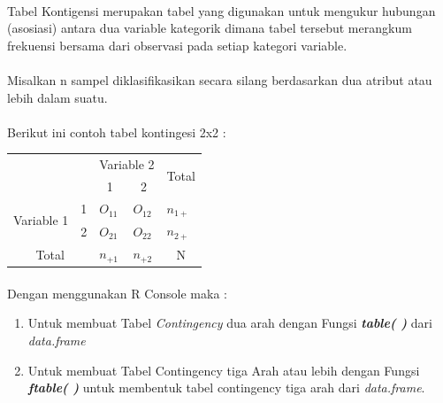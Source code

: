 \documentclass[a4paper,12pt]{article}
\begin{document}
\paragraph{}
Tabel Kontigensi merupakan tabel yang digunakan untuk mengukur hubungan (asosiasi) antara dua variable kategorik dimana tabel tersebut merangkum frekuensi bersama dari observasi pada setiap kategori variable. 
\paragraph{}
Misalkan n sampel diklasifikasikan secara silang berdasarkan dua atribut atau lebih dalam suatu.
\paragraph{}
Berikut ini contoh tabel kontingesi 2x2 :
\begin{table}[!ht]
	\begin{tabular}{|c|c|l|l|c|}
		\hline
		\multicolumn{2}{|l|}{\multirow{2}{*}{}} & \multicolumn{2}{l|}{Variable 2}                 & \multirow{2}{*}{Total} \\ \cline{3-4}
		\multicolumn{2}{|l|}{}                  & \multicolumn{1}{c|}{1} & \multicolumn{1}{c|}{2} &                        \\ \hline
		\multirow{2}{*}{Variable 1}     & 1     & $O_{11}$                       &$O_{12}$                      &\multicolumn{1}{l|}{$n_{1+}$ }  \\ \cline{2-5} 
		& 2     & $O_{21}$                       & $O_{22}$                       & \multicolumn{1}{l|}{$n_{2+}$}  \\ \hline
		\multicolumn{2}{|c|}{Total}             & $n_{+1}$                       &  $n_{+2}$                      & N                      \\ \hline
	\end{tabular}
\end{table}
\paragraph{}
Dengan menggunakan R Console maka :
\begin{enumerate}
	\item Untuk membuat Tabel \textit{Contingency} dua arah dengan Fungsi \textit{\textbf{table( )}} dari  \textit{data.frame}
	\item Untuk membuat Tabel Contingency tiga Arah atau lebih dengan Fungsi \textit{\textbf{ftable( )}} untuk membentuk tabel contingency tiga arah dari \textit{data.frame}.
\end{enumerate}
\end{document}
